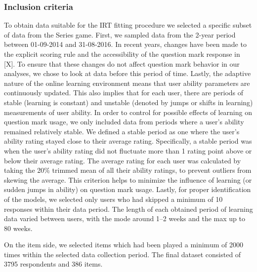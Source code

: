 \documentclass[12pt]{article}
\begin{document}
\subsubsection{Inclusion criteria}
To obtain data suitable for the IRT fitting procedure we selected a specific subset of data from the Series game. First, we sampled data from the 2-year period between 01-09-2014 and 31-08-2016. In recent years, changes have been made to the explicit scoring rule and the accessibility of the question mark response in [X]. To ensure that these changes do not affect question mark behavior in our analyses, we chose to look at data before this period of time. Lastly, the adaptive nature of the online learning environment means that user ability parameters are continuously updated. This also implies that for each user, there are periods of stable (learning is constant) and unstable (denoted by jumps or shifts in learning) measurements of user ability. In order to control for possible effects of learning on question mark usage, we only included data from periods where a user's ability remained relatively stable. We defined a stable period as one where the user's ability rating stayed close to their average rating. Specifically, a stable period was when the user's ability rating did not fluctuate more than 1 rating point above or below their average rating. The average rating for each user was calculated by taking the 20\% trimmed mean of all their ability ratings, to prevent outliers from skewing the average. This criterion helps to minimize the influence of learning (or sudden jumps in ability) on question mark usage. Lastly, for proper identification of the models, we selected only users who had skipped a minimum of 10 responses within their data period. The length of each obtained period of learning data varied between users, with the mode around 1--2 weeks and the max up to 80 weeks.

On the item side, we selected items which had been played a minimum of \num{2000} times within the selected data collection period. The final dataset consisted of \num{3795} respondents and \num{386} items. 
\end{document}
